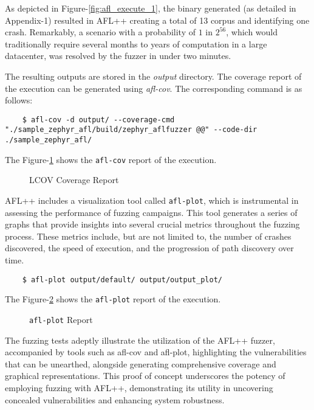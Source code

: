 As depicted in Figure-\ref{fig:afl_execute_1}, the binary generated
(as detailed in Appendix-1) resulted in AFL++ creating a total of
13 corpus and identifying one crash. Remarkably, a scenario with a
probability of \(1\) in \(2^{56}\), which would traditionally
require several months to years of computation in a large datacenter,
was resolved by the fuzzer in under two minutes.

The resulting outputs are stored in the \textit{output} directory.
The coverage report of the execution can be generated using \textit{afl-cov}\cite{GitHubmr91:online}.
The corresponding command is as follows:

\begin{verbatim}
    $ afl-cov -d output/ --coverage-cmd "./sample_zephyr_afl/build/zephyr_aflfuzzer @@" --code-dir ./sample_zephyr_afl/
\end{verbatim}

The Figure-\ref{fig:afl_cov} shows the \texttt{afl-cov} report of the execution.
\begin{figure}[H]
        \caption{LCOV Coverage Report\cite{UbuntuMa97:online}}\label{fig:afl_cov}
\end{figure}

AFL++ includes a visualization tool called \texttt{afl-plot}\cite{AFLFunct92:online},
which is instrumental in assessing the performance of fuzzing campaigns.
This tool generates a series of graphs that provide insights into several
crucial metrics throughout the fuzzing process. These metrics include,
but are not limited to, the number of crashes discovered,
the speed of execution, and the progression of path discovery over time.

\begin{verbatim}
    $ afl-plot output/default/ output/output_plot/
\end{verbatim}

The Figure-\ref{fig:afl_plot} shows the \texttt{afl-plot} report of the execution.
\begin{figure}[H]
        \caption{\texttt{afl-plot} Report}\label{fig:afl_plot}
\end{figure}

The fuzzing tests adeptly illustrate the utilization of the AFL++ fuzzer,
accompanied by tools such as afl-cov and afl-plot, highlighting
the vulnerabilities that can be unearthed, alongside generating
comprehensive coverage and graphical representations. This proof of
concept underscores the potency of employing fuzzing with AFL++,
demonstrating its utility in uncovering concealed vulnerabilities
and enhancing system robustness.


